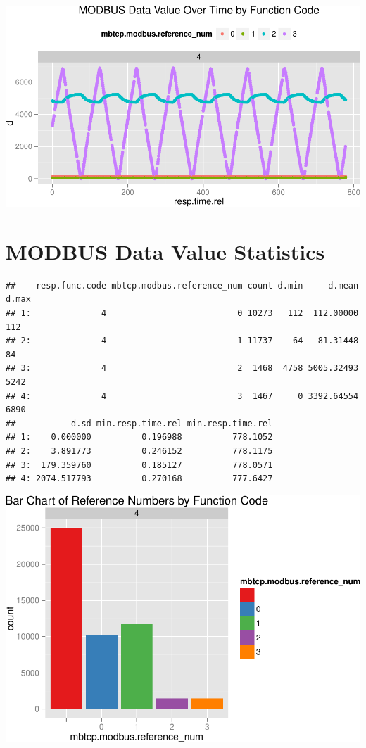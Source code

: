 \documentclass[]{article}
\begin{document}
\includegraphics{modbus_files/figure-latex/unnamed-chunk-19-1.pdf}

\pagebreak

\section{MODBUS Data Value
Statistics}\label{modbus-data-value-statistics}

\begin{verbatim}
##    resp.func.code mbtcp.modbus.reference_num count d.min     d.mean d.max
## 1:              4                          0 10273   112  112.00000   112
## 2:              4                          1 11737    64   81.31448    84
## 3:              4                          2  1468  4758 5005.32493  5242
## 4:              4                          3  1467     0 3392.64554  6890
##           d.sd min.resp.time.rel min.resp.time.rel
## 1:    0.000000          0.196988          778.1052
## 2:    3.891773          0.246152          778.1175
## 3:  179.359760          0.185127          778.0571
## 4: 2074.517793          0.270168          777.6427
\end{verbatim}

\begin{center}\includegraphics{modbus_files/figure-latex/unnamed-chunk-21-1} \end{center}
\end{document}
